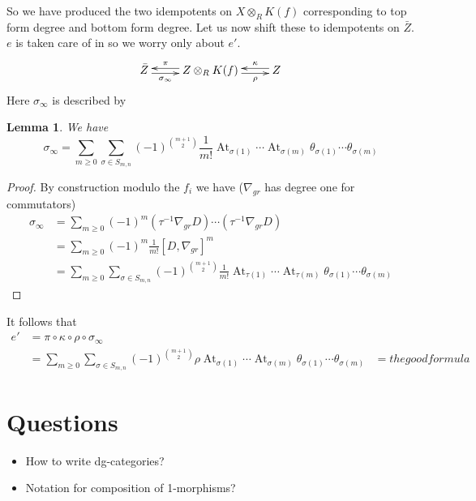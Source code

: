 \documentclass{compositio}
\newtheorem{lemma}[theorem]{Lemma}
\theoremstyle{definition}
\numberwithin{equation}{section}
\DeclareMathOperator{\At}{At}
\begin{document}
So we have produced the two idempotents on $X \otimes_R K(f)$ corresponding to top form degree and bottom form degree. Let us now shift these to idempotents on $\bar{Z}$. $e$ is taken care of in \cite{??} so we worry only about $e'$.
\[
\xymatrix{
\bar{Z} \ar@<-0.5ex>[r]_-{\sigma_\infty} & Z \otimes_R K(f) \ar@<-0.5ex>[l]_-{\pi} \ar@<-0.5ex>[r]_-{\rho} & Z \ar@<-0.5ex>[l]_-{\kappa}
}
\]
Here $\sigma_\infty$ is described by

\begin{lemma} We have
\[
\sigma_\infty = \sum_{m \ge 0} \sum_{\sigma \in S_{m,n}} (-1)^{\binom{m+1}{2}} \frac{1}{m!} \At_{\sigma(1)} \cdots \At_{\sigma(m)} \theta_{\sigma(1)} \cdots \theta_{\sigma(m)}
\]
\end{lemma}
\begin{proof}
By construction modulo the $f_i$ we have ($\nabla_{gr}$ has degree one for commutators)
\begin{align*}
\sigma_\infty &= \sum_{m \ge 0} (-1)^m (\tau^{-1} \nabla_{gr} D) \cdots (\tau^{-1} \nabla_{gr} D) \,\\
&= \sum_{m \ge 0} (-1)^m \frac{1}{m!} [ D, \nabla_{gr} ]^m \\
&= \sum_{m \ge 0} \sum_{\sigma \in S_{m,n}} (-1)^{\binom{m+1}{2}} \frac{1}{m!} \At_{\tau(1)} \cdots \At_{\tau(m)} \theta_{\sigma(1)} \cdots \theta_{\sigma(m)}
\end{align*}
\end{proof}

It follows that
\begin{align*}
e' &= \pi \circ \kappa \circ \rho \circ \sigma_\infty\\
&= \sum_{m \ge 0} \sum_{\sigma \in S_{m,n}} (-1)^{\binom{m+1}{2}} \rho \At_{\sigma(1)} \cdots \At_{\sigma(m)} \theta_{\sigma(1)} \cdots \theta_{\sigma(m)}
&= the good formula
\end{align*}

\newpage

\section{Questions}

\begin{itemize}
\item How to write dg-categories?
\item Notation for composition of 1-morphisms?
\end{itemize}
\end{document}
